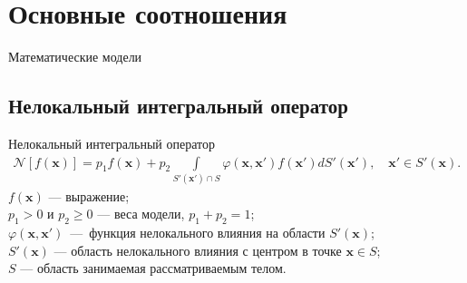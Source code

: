 \section{Основные соотношения}

\begin{frame}
	\centering
	\Huge
	Математические модели
\end{frame}

\subsection{Нелокальный интегральный оператор}
\begin{frame}{Нелокальный интегральный оператор}
	\begin{gather*}
		\mathcal{N} [f(\boldsymbol{x})] = 
		p_1 f(\boldsymbol{x}) + 
		p_2 \int\limits_{S'(\boldsymbol{x}') \cap S} 
			\varphi(\boldsymbol{x}, \boldsymbol{x}') f(\boldsymbol{x}')
		dS'(\boldsymbol{x}'),
		\quad
		\boldsymbol{x}' \in S'(\boldsymbol{x}).
	\end{gather*}
	$f(\boldsymbol{x})$ --- выражение; \\
	$p_1 > 0$ и $p_2 \geqslant 0$ --- веса модели, $p_1 + p_2 = 1$; \\
	$\varphi(\boldsymbol{x}, \boldsymbol{x}')$~---~функция нелокального влияния на области $S'(\boldsymbol{x})$; \\
	$S'(\boldsymbol{x})$ --- область нелокального влияния с центром в точке $\boldsymbol{x} \in S$;\\
	$S$ --- область занимаемая рассматриваемым телом.
	

\end{frame}
